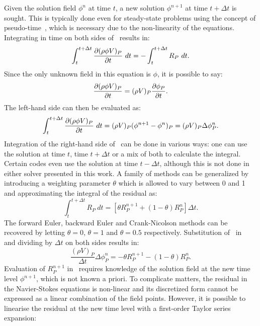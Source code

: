 Given the solution field $\phi^n$ at time $t$, a new solution $\phi^{n+1}$ at time $t + \Delta t$ is sought. This is typically done even for steady-state problems using the concept of pseudo-time~\cite{blazek2015computational}, which is necessary due to the non-linearity of the equations. Integrating in time on both sides of~ results in:
\begin{equation}
    \int_t^{t+\Delta t}
         \frac{\partial (\rho \phi V)_P}{\partial t} 
   ~dt
    = -\int_t^{t+\Delta t} R_P~dt
    \label{eq:time2}.
\end{equation}
Since the only unknown field in this equation is $\phi$, it is possible to say:
\begin{equation*}
     \frac{\partial (\rho \phi V)_P}{\partial t}  = (\rho V)_P  \frac{\partial \phi_P}{\partial t} .
\end{equation*}
The left-hand side  can then be evaluated as:
\begin{equation}
    \int_t^{t+\Delta t}
         \frac{\partial (\rho \phi V)_P}{\partial t} 
   ~dt =
   (\rho V)_P (\phi^{n+1} - \phi^n)_P
   = (\rho V)_P \Delta \phi_P^n
   \label{eq:timediff}.
\end{equation}
Integration of the right-hand side of~ can be done in various ways: one can use the solution at time $t$, time $t + \Delta t$ or a mix of both to calculate the integral. Certain codes even use the solution at time $t - \Delta t$, although this is not done in either solver presented in this work.  A family of methods can be generalized by introducing a weighting parameter $\theta$ which is allowed to vary between 0 and 1 and approximating the integral of the residual as:
\begin{equation}
    \int_t^{t+\Delta t} R_P~dt = \left[
        \theta R_P^{n+1} + (1 - \theta) R_P^n
    \right] \Delta t
    \label{eq:timeint}.
\end{equation}
The forward Euler, backward Euler and Crank-Nicolson methods can be recovered by letting $\theta = 0$, $\theta = 1$ and $\theta = 0.5$ respectively. Substitution of~ in~ and dividing by $\Delta t$ on both sides results in:
\begin{equation}
    \frac{(\rho V)_P}{\Delta t}\Delta \phi_P^n = -\theta R_P^{n+1} - (1 - \theta) R_P^n
    \label{eq:timeimp}.
\end{equation}
Evaluation of $R_P^{n+1}$ in~ requires knowledge of the solution field at the new time level $\phi^{n+1}$, which is not known a priori. To complicate matters, the residual in the Navier-Stokes equations is non-linear and its discretized form cannot be expressed as a linear combination of the field points. However, it is possible to linearise the residual at the new time level with a first-order Taylor series expansion:
